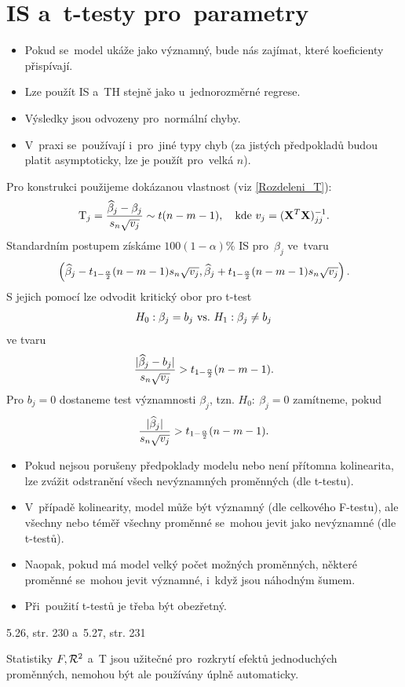 \section{IS a~t-testy pro~parametry}
\begin{itemize}
	\item Pokud se~model ukáže jako významný, bude nás zajímat, které koeficienty přispívají.
	\item Lze použít IS a~TH stejně jako u~jednorozměrné regrese.
	\item Výsledky jsou odvozeny pro~normální chyby.
	\item V~praxi se~používají i~pro~jiné typy chyb (za jistých předpokladů budou platit asymptoticky, lze je použít pro~velká $n$).
\end{itemize}
Pro konstrukci použijeme dokázanou vlastnost (viz \eqref{Rozdeleni_T}):
 $$ \mathrm{T}_j = \frac{\widehat{\beta}_j-\beta_j}{s_n\sqrt{v_j}}\sim t(n-m-1),\quad\text{kde } v_j = (\mathbf{X}^T\mathbf{X})_{jj}^{-1}. $$
Standardním postupem získáme $100(1-\alpha)$\% IS pro~$\beta_j$ ve~tvaru
 $$ \left(\widehat{\beta}_j-t_{1-\frac{\alpha}{2}}(n-m-1)s_n\sqrt{v_j},\widehat{\beta}_j+t_{1-\frac{\alpha}{2}}(n-m-1)s_n\sqrt{v_j} \right).$$
S jejich pomocí lze odvodit kritický obor pro t-test
 $$ H_0: \beta_j = b_j ~\text{vs.}~ H_1: \beta_j\neq b_j $$
ve tvaru
 $$ \frac{|\widehat{\beta}_j-b_j|}{s_n\sqrt{v_j}}>t_{1-\frac{\alpha}{2}}(n-m-1).$$
Pro $b_j = 0$ dostaneme test významnosti $\beta_j$, tzn. $H_0:~\beta_j = 0$ zamítneme, pokud
 $$ \frac{|\widehat{\beta}_j|}{s_n\sqrt{v_j}}>t_{1-\frac{\alpha}{2}}(n-m-1). $$
\begin{remark}
	\begin{itemize}
		\item Pokud nejsou porušeny předpoklady modelu nebo není přítomna kolinearita, lze zvážit odstranění všech nevýznamných proměnných (dle t-testu).
		\item V~případě kolinearity, model může být významný (dle celkového F-testu), ale všechny nebo téměř všechny proměnné se~mohou jevit jako nevýznamné (dle t-testů).
		\item Naopak, pokud má model velký počet možných proměnných, některé proměnné se~mohou jevit významné, i~když jsou náhodným šumem.
		\item Při~použití t-testů je třeba být obezřetný.
	\end{itemize}
\end{remark}
\begin{example}
	5.26, str. 230 a~5.27, str. 231
\end{example}
\begin{remark}
	Statistiky $F,\mathcal{R}^2$ a~T jsou užitečné pro~rozkrytí efektů jednoduchých proměnných, nemohou být ale používány úplně automaticky.
\end{remark}

